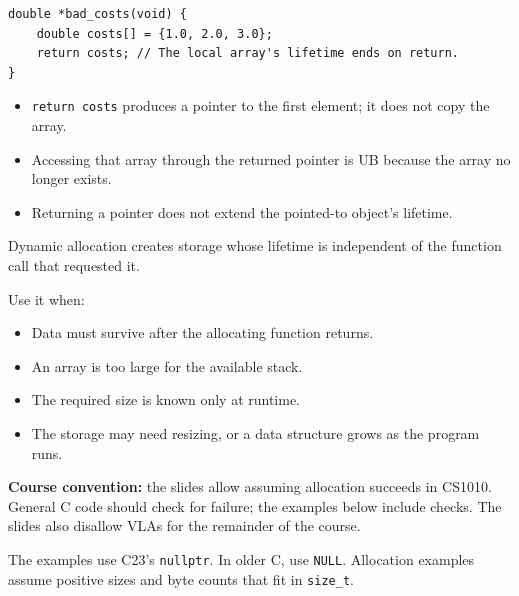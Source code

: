 \documentclass[11pt,a4paper]{article}
\providecommand{\tightlist}{\setlength{\itemsep}{0pt}\setlength{\parskip}{0pt}}
\begin{document}
\label{automatic-and-dynamic-lifetimes}
\hypertarget{automatic-and-dynamic-lifetimes}{}

\label{why-returning-a-local-array-fails}
\hypertarget{why-returning-a-local-array-fails}{}

\begin{lstlisting}[style=cscode]
double *bad_costs(void) {
    double costs[] = {1.0, 2.0, 3.0};
    return costs; // The local array's lifetime ends on return.
}
\end{lstlisting}

\begin{itemize}
\tightlist
\item
  \texttt{return\ costs} produces a pointer to the first element; it does not copy the array.
\item
  Accessing that array through the returned pointer is UB because the array no longer exists.
\item
  Returning a pointer does not extend the pointed-to object's lifetime.
\end{itemize}

\label{dynamic-allocation}
\hypertarget{dynamic-allocation}{}

Dynamic allocation creates storage whose lifetime is independent of the function call that requested it.

Use it when:

\begin{itemize}
\tightlist
\item
  Data must survive after the allocating function returns.
\item
  An array is too large for the available stack.
\item
  The required size is known only at runtime.
\item
  The storage may need resizing, or a data structure grows as the program runs.
\end{itemize}

\textbf{Course convention:} the slides allow assuming allocation succeeds in CS1010. General C code should check for failure; the examples below include checks. The slides also disallow VLAs for the remainder of the course.

The examples use C23's \texttt{nullptr}. In older C, use \texttt{NULL}. Allocation examples assume positive sizes and byte counts that fit in \texttt{size\_t}.
\end{document}
